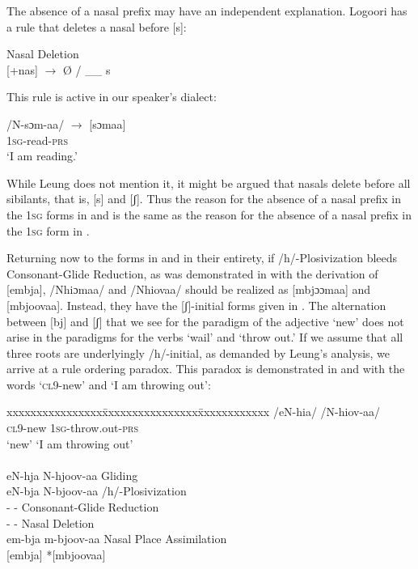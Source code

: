 \documentclass[output=paper]{langsci/langscibook}
\begin{document}
The absence of a nasal prefix may have an independent explanation. Logoori has a rule that deletes a nasal before [s]:



\ea\label{ex:glewwe:20}{}
 Nasal Deletion \citep[116]{Leung1991}\\{}
 [+nas] $\rightarrow$ Ø / \_\_ s\\
\z

This rule is active in our speaker’s dialect:

\ea\label{ex:glewwe:21}{}
 /N-sɔm-aa/  $\rightarrow$  [sɔmaa]\\
\textsc{1sg}-read-\textsc{prs}\\
\glt ‘I am reading.’
\z

While Leung does not mention it, it might be argued that nasals delete before all sibilants, that is, [s] and [ʃ]. Thus the reason for the absence of a nasal prefix in the 1\textsc{sg} forms in  and  is the same as the reason for the absence of a nasal prefix in the 1\textsc{sg} form in . 

Returning now to the forms in  and  in their entirety, if /h/-Plosivization bleeds Consonant-Glide Reduction, as was demonstrated in  with the derivation of [embja], /Nhiɔmaa/ and /Nhiovaa/ should be realized as [mbjɔɔmaa] and [mbjoovaa]. Instead, they have the [ʃ]-initial forms given in . The alternation between [bj] and [ʃ] that we see for the paradigm of the adjective ‘new’ does not arise in the paradigms for the verbs ‘wail’ and ‘throw out.’ If we assume that all three roots are underlyingly /h/-initial, as demanded by Leung’s analysis, we arrive at a rule ordering paradox. This paradox is demonstrated in  and  with the words ‘\textsc{cl}9-new’ and ‘I am throwing out\textsc{’}:

\ea\label{ex:glewwe:22}{}
\begin{tabbing} 
xxxxxxxxxxxxxxxx\=xxxxxxxxxxxxxxxx\=xxxxxxxxxxxx\kill
 /eN-hia/   \> /N-hiov-aa/\\
  \textsc{cl9}-new \> \textsc{1sg}-throw.out-\textsc{prs} \> \\
‘new’ \>  ‘I am throwing out’ \\
\\
eN-hja   \>   N-hjoov-aa    \>    Gliding\\
eN-bja   \>   N-bjoov-aa    \>    /h/-Plosivization\\
{}-     \>   {}-       \>   Consonant-Glide Reduction\\
{}-     \>   {}-      \>    Nasal Deletion\\
em-bja  \>    m-bjoov-aa    \>    Nasal Place Assimilation\\{}
[embja]    \>  *[mbjoovaa]  \\ 
\end{tabbing}
\z
\end{document}
